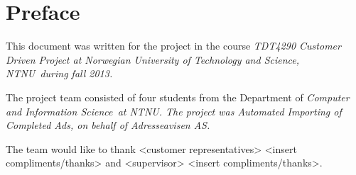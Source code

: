 \section{Preface}
This document was written for the project in the course \em TDT4290 Customer Driven Project at Norwegian University of Technology and Science, NTNU\em \ during fall 2013.

The project team consisted of four students from the Department of \em Computer and Information Science\em \ at \em NTNU\em. The project was \em Automated Importing of Completed Ads\em, on behalf of \em Adresseavisen AS\em.

The team would like to thank <customer representatives> <insert compliments/thanks> and <supervisor> <insert compliments/thanks>.